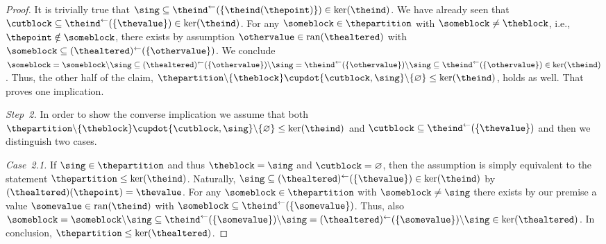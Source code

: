\documentclass[10pt,a4paper]{amsart}
\numberwithin{equation}{section}
\newcommand{\sranx}[1]{\mathrm{ran}(#1)}
\newcommand{\subproof}[1]{\textit{#1}}
\newcommand{\spimgx}[2]{#1^{\leftarrow}(#2)}
\newcommand{\finerthan}{\mathrel{\leq}}
\begin{document}
{\begin{proof}
    It is trivially true that $\sing\subseteq \spimgx{\theind}{\{\theind(\thepoint)\}}\in \ker(\theind)$. We have already seen that $\cutblock\subseteq\spimgx{\theind}{\{\thevalue\}}\in\ker(\theind)$. For any $\someblock\in\thepartition$ with $\someblock\neq\theblock$, i.e., $\thepoint\notin \someblock$, there exists by assumption $\othervalue\in \sranx{\thealtered}$ with $\someblock\subseteq \spimgx{(\thealtered)}{\{\othervalue\}}$. We conclude $\someblock=\someblock\backslash\sing\subseteq \spimgx{(\thealtered)}{\{\othervalue\}}\backslash\sing=\spimgx{\theind}{\{\othervalue\}}\backslash \sing\subseteq \spimgx{\theind}{\{\othervalue\}}\in \ker(\theind)$. Thus, the other half of the claim, $\thepartition\backslash \{\theblock\}\cupdot \{\cutblock,\allowbreak\sing\}\backslash \{\varnothing\}\finerthan \ker(\theind)$, holds as well. That proves one implication.

    \subproof{Step~2.} In order to show the converse implication we assume that both $\thepartition\backslash \{\theblock\}\cupdot \{\cutblock,\allowbreak\sing\}\backslash \{\varnothing\}\finerthan \ker(\theind)$ and $ \cutblock\subseteq \spimgx{\theind}{\{\thevalue\}}$ and then we distinguish two cases.

    \subproof{Case~2.1.} If $\sing\in \thepartition$ and thus $\theblock=\sing$ and  $\cutblock=\varnothing$, then the assumption is simply equivalent to the statement $\thepartition\finerthan\ker(\theind)$. Naturally, $\sing\subseteq \spimgx{(\thealtered)}{\{\thevalue\}}\in\ker(\theind)$ by $(\thealtered)(\thepoint)=\thevalue$. For any $\someblock\in\thepartition$ with $\someblock\neq\sing$ there exists by our premise a value $\somevalue\in \sranx{\theind}$ with $\someblock\subseteq \spimgx{\theind}{\{\somevalue\}}$. Thus, also $\someblock=\someblock\backslash \sing\subseteq \spimgx{\theind}{\{\somevalue\}}\backslash\sing=\spimgx{(\thealtered)}{\{\somevalue\}}\backslash\sing\in\ker(\thealtered)$. In conclusion, $\thepartition\finerthan\ker(\thealtered)$.


\end{proof}}
\end{document}
